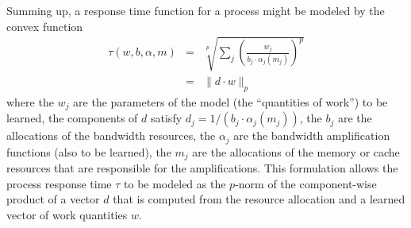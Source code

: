 Summing up, a response time function for a process might be modeled by the convex function
\begin{eqnarray*}
\tau(w,b,\alpha,m) &=& \sqrt[p]{\sum_j \left(\frac{w_j}{b_j\cdot\alpha_j(m_j)}\right)^p}  \\
                   &=& \|d \cdot w \|_p
\end{eqnarray*}
where the $w_j$ are the parameters of the model (the “quantities of work”) to be learned,
the components of $d$ satisfy $d_j = 1/(b_j\cdot\alpha_j(m_j))$,
the $b_j$  are the allocations of the bandwidth resources,
the $\alpha_j$ are the bandwidth amplification functions (also to be learned),
the $m_j$ are the allocations of the memory or cache resources that are responsible for the amplifications.
This formulation allows the process response time $\tau$ to be modeled as the $p$-norm of
the component-wise product of a vector $d$ that is computed from the resource allocation
and a learned vector of work quantities $w$.
